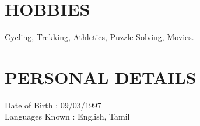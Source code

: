 \documentclass[margin, 10pt]{res} %
\begin{document}
\begin{resume}
\section{HOBBIES}
Cycling, Trekking, Athletics, Puzzle Solving, Movies.
\section{PERSONAL DETAILS}
Date of Birth \hspace{18pt} : 09/03/1997 \\
Languages Known \hspace{1pt}: English, Tamil
\end{resume}
\end{document}

